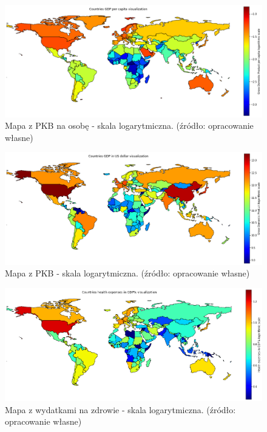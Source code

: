 \documentclass[11pt]{report}
\begin{document}
    \begin{figure}[!htp]
        \centering
        \includegraphics[width=\linewidth]{fig/CLUST/gdp_log.png}
        \caption{Mapa z PKB na osobę - skala logarytmiczna. (źródło: opracowanie własne)}
        \label{fig:clustGDP_log}
    \end{figure}

    \begin{figure}[!htp]
        \centering
        \includegraphics[width=\linewidth]{fig/CLUST/gdp2015.png}
        \caption{Mapa z PKB - skala logarytmiczna. (źródło: opracowanie własne)}
        \label{fig:clustGDP2015_log}
    \end{figure}

    \begin{figure}[!htp]
        \centering
        \includegraphics[width=\linewidth]{fig/CLUST/health2015.png}
        \caption{Mapa z wydatkami na zdrowie - skala logarytmiczna. (źródło: opracowanie własne)}
        \label{fig:clustHealth2015_log}
    \end{figure}
\end{document}
